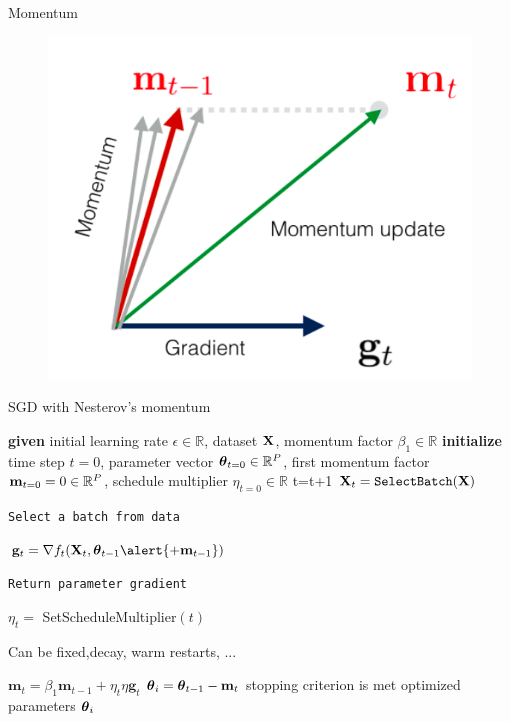 \documentclass[xcolor=pdftex,dvipsnames,table,mathserif]{beamer}
\begin{document}
\begin{frame}{Momentum}
\begin{figure}
\includegraphics[width=.95\columnwidth]{../graphics/Momentum}
\end{figure}
\end{frame}

\begin{frame}{SGD with Nesterov's momentum \cite{Nesterov83}}
\begin{algorithm}[H]
\begin{algorithmic}[1]
\STATE \textbf{given} initial learning rate $\epsilon \in \mathbb{R}$, dataset $\mathbf{X}$, momentum factor $\beta_1 \in \mathbb{R}$
\STATE \textbf{initialize} time step $t=0$, parameter vector $\boldsymbol{\theta}_{t=0} \in \mathbb{R}^P$, first momentum factor $\mathbf{m}_{t=0}=0 \in \mathbb{R}^P$, schedule multiplier $\eta_{t=0} \in \mathbb{R}$
\REPEAT
\STATE t=t+1
\STATE $\mathbf{X}_t=\texttt{SelectBatch} (\mathbf{X})$ \begin{tiny}\texttt{Select a batch from data} \end{tiny}
\STATE $\mathbf{g}_t = \nabla f_t(\X_t,\param_{t-1}\alert{+\mathbf{m}_{t-1}})$ \begin{tiny}\texttt{Return parameter gradient} \end{tiny}
\STATE $\eta_t = $ SetScheduleMultiplier$(t)$ \begin{tiny}{Can be fixed,decay, warm restarts, ...}\end{tiny}
\STATE $\mathbf{m}_t = \beta_1 \mathbf{m}_{t-1} + \eta_{t} \eta  \mathbf{g}_t $
\STATE $\boldsymbol{\theta}_i=\boldsymbol{\theta}_{t-1} - \mathbf{m}_{t}$
\UNTIL stopping criterion is met
\RETURN optimized parameters $\boldsymbol{\theta}_i$
\end{algorithmic}
\caption{pseudocode for stochastic gradient descent \alert{with Momentum} }
\label{alg:seq}
\end{algorithm}
\end{frame}
\end{document}
